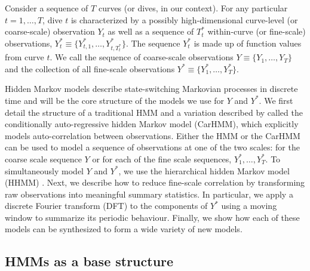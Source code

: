 
Consider a sequence of $T$ curves (or dives, in our context). For any particular $t = 1,
\ldots,T$, dive $t$ is characterized by a possibly high-dimensional curve-level (or coarse-scale) observation $Y_t$ as well as a sequence of $T^*_t$ within-curve (or fine-scale) observations, $Y^*_{t} \equiv \big\{Y^*_{t,1},\ldots,Y^*_{t,T^*_t}\big\}$. The sequence $Y^*_{t}$ is made up of function values from curve $t$. We call the sequence of coarse-scale observations $Y \equiv \big\{Y_1, \ldots, Y_T\big\}$ and the collection of all fine-scale observations $Y^* \equiv \big\{Y^*_1,\ldots,Y^*_T \big\}$.

Hidden Markov models describe state-switching Markovian processes in discrete time and will be the core structure of the models we use for $Y$ and $Y^*$. We first detail the structure of a traditional HMM and a variation described by \cite{Lawler:2019} called the conditionally auto-regressive hidden Markov model (CarHMM), which explicitly models auto-correlation between observations. Either the HMM or the CarHMM can be used to model a sequence of observations at one of the two scales: for the coarse scale sequence $Y$ or for each of the fine scale sequences, $Y_1^*,\ldots, Y_T^*$. To simultaneously model $Y$ and $Y^*$, we use the hierarchical hidden Markov model (HHMM) \citep{Barajas:2017,Adam:2019}.
Next, we describe how to reduce fine-scale correlation by transforming raw observations into meaningful summary statistics. In particular, we apply a discrete Fourier transform (DFT) to the components of $Y^*$ using a moving window to summarize its periodic behaviour. Finally, we show how each of these models can be synthesized to form a wide variety of new models.

\subsection{HMMs as a base structure}

